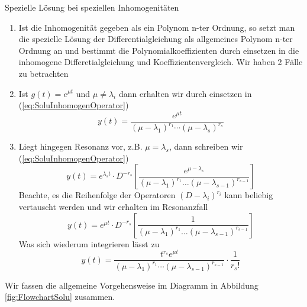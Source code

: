 \begin{note}{Spezielle Lösung bei speziellen Inhomogenitäten}
  \begin{enumerate}
    \item Ist die Inhomogenität gegeben als ein Polynom n-ter Ordnung, so setzt
      man die spezielle Lösung der Differentialgleichung als allgemeines
      Polynom n-ter Ordnung an und bestimmt die Polynomialkoeffizienten durch
      einsetzen in die inhomogene Differetialgleichung und
      Koeffizientenvergleich.  Wir haben 2 Fälle zu betrachten
    \item Ist $g(t)=e^{\mu t}$ und $\mu\ne\lambda_i$ dann erhalten wir durch
      einsetzen in (\ref{eq:SoluInhomogenOperator}) 
  \[ y(t)=\frac{e^{\mu t}}{(\mu-\lambda_1)^{r_1}
            \cdots(\mu-\lambda_s)^{r_s}}\]
	  \item Liegt hingegen Resonanz vor, z.B.  $\mu=\lambda_s$, dann schreiben wir (\ref{eq:SoluInhomogenOperator})
	    \[y(t)=e^{\lambda_s t}\cdot D^{-r_s}
	    \left[\frac{e^{\mu-\lambda_s}}{(\mu-\lambda_1)^{r_1}\dots(\mu-\lambda_{s-1})^{r_{s-1}}}\right]\]
	    Beachte, es die Reihenfolge der Operatoren $(D-\lambda_i)^{r_i}$
	    kann beliebig vertauscht werden und wir erhalten im Resonanzfall
	    \[y(t)=e^{\mu t}\cdot D^{-r_s}
	      \left[\frac{1}{(\mu-\lambda_1)^{r_1}\dots(\mu-\lambda_{s-1})^{r_{s-1}}}\right]\]
	    Was sich wiederum integrieren lässt zu
	\[ y(t)=\frac{t^{r_s}e^{\mu t}}{(\mu-\lambda_1)^{r_1} \cdots(\mu-\lambda_{s-1})^{r_{s-1}}}
	\cdot\frac{1}{r_s!}\]
  \end{enumerate}
\end{note}
Wir fassen die allgemeine Vorgehensweise im Diagramm in Abbildung
\ref{fig:FlowchartSolu} zusammen.
%
